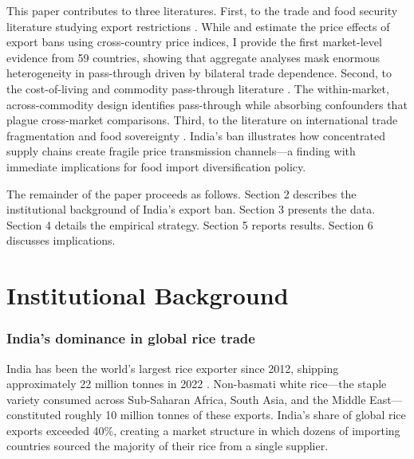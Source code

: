 \documentclass[12pt]{article}
\begin{document}
This paper contributes to three literatures. First, to the trade and food security literature studying export restrictions \citep{martin2012export, anderson2014food, laborde2021covid, gotz2020russia}. While \citet{headey2011rethinking} and \citet{giordani2016food} estimate the price effects of export bans using cross-country price indices, I provide the first market-level evidence from 59 countries, showing that aggregate analyses mask enormous heterogeneity in pass-through driven by bilateral trade dependence. Second, to the cost-of-living and commodity pass-through literature \citep{atkin2015retail, nakamura2018high, cavallo2023online}. The within-market, across-commodity design identifies pass-through while absorbing confounders that plague cross-market comparisons. Third, to the literature on international trade fragmentation and food sovereignty \citep{fajgelbaum2020return, evenett2022trade}. India's ban illustrates how concentrated supply chains create fragile price transmission channels---a finding with immediate implications for food import diversification policy.

The remainder of the paper proceeds as follows. Section 2 describes the institutional background of India's export ban. Section 3 presents the data. Section 4 details the empirical strategy. Section 5 reports results. Section 6 discusses implications.


\section{Institutional Background}

\subsubsection*{India's dominance in global rice trade} India has been the world's largest rice exporter since 2012, shipping approximately 22 million tonnes in 2022 \citep{usda2023grain}. Non-basmati white rice---the staple variety consumed across Sub-Saharan Africa, South Asia, and the Middle East---constituted roughly 10 million tonnes of these exports. India's share of global rice exports exceeded 40\%, creating a market structure in which dozens of importing countries sourced the majority of their rice from a single supplier.
\end{document}
